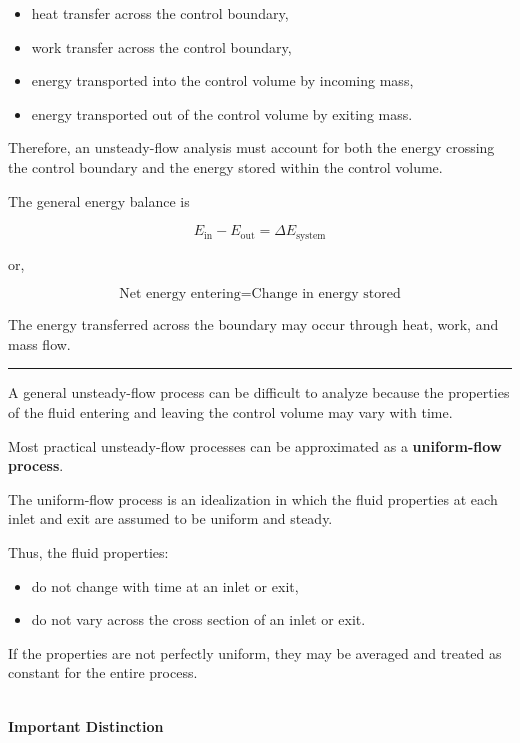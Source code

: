 \documentclass[12pt]{article}
\newcommand{\mysubsection}[2]{%
    \vspace{5px}
    \noindent{\headingfont\large #1\space #2\par}
    \vspace{4pt}
    \hrule
    \vspace{15pt}
}
\begin{document}
\begin{itemize}
    \item heat transfer across the control boundary,
    \item work transfer across the control boundary,
    \item energy transported into the control volume by incoming mass,
    \item energy transported out of the control volume by exiting mass.
\end{itemize}

Therefore, an unsteady-flow analysis must account for both the energy crossing the control boundary and the energy stored within the control volume.

The general energy balance is

\begin{equation}
E_{\mathrm{in}}-E_{\mathrm{out}}
=
\Delta E_{\mathrm{system}}
\end{equation}

or,

\begin{equation}
\boxed{
\text{Net energy entering}
=
\text{Change in energy stored}
}
\end{equation}

The energy transferred across the boundary may occur through heat, work, and mass flow.

\mysubsection{}{Uniform-Flow Process}

A general unsteady-flow process can be difficult to analyze because the properties of the fluid entering and leaving the control volume may vary with time.

Most practical unsteady-flow processes can be approximated as a \textbf{uniform-flow process}.

The uniform-flow process is an idealization in which the fluid properties at each inlet and exit are assumed to be uniform and steady.

Thus, the fluid properties:

\begin{itemize}
    \item do not change with time at an inlet or exit,
    \item do not vary across the cross section of an inlet or exit.
\end{itemize}

If the properties are not perfectly uniform, they may be averaged and treated as constant for the entire process.

\textbf{\\ Important Distinction}
\end{document}
